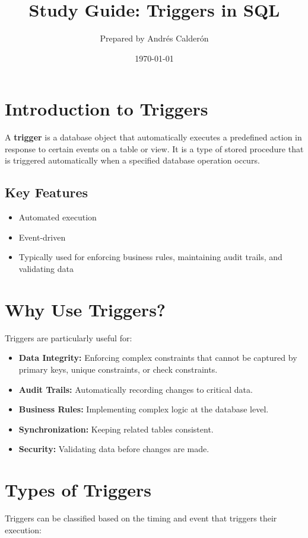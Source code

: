 \documentclass{article}
\title{Study Guide: Triggers in SQL}
\author{Prepared by Andrés Calderón}
\date{\today}
\begin{document}
\maketitle

\section{Introduction to Triggers}
A \textbf{trigger} is a database object that automatically executes a predefined action in response to certain events on a table or view. It is a type of stored procedure that is triggered automatically when a specified database operation occurs.

\subsection*{Key Features}
\begin{itemize}
    \item Automated execution
    \item Event-driven
    \item Typically used for enforcing business rules, maintaining audit trails, and validating data
\end{itemize}

\section{Why Use Triggers?}
Triggers are particularly useful for:
\begin{itemize}
    \item \textbf{Data Integrity:} Enforcing complex constraints that cannot be captured by primary keys, unique constraints, or check constraints.
    \item \textbf{Audit Trails:} Automatically recording changes to critical data.
    \item \textbf{Business Rules:} Implementing complex logic at the database level.
    \item \textbf{Synchronization:} Keeping related tables consistent.
    \item \textbf{Security:} Validating data before changes are made.
\end{itemize}

\section{Types of Triggers}
Triggers can be classified based on the timing and event that triggers their execution:
\end{document}

